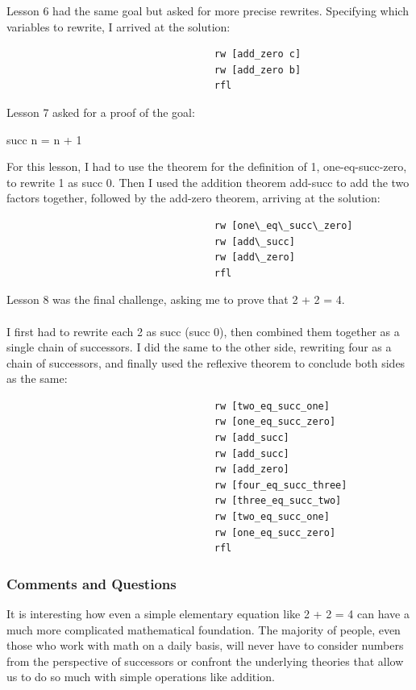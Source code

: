 \documentclass{article}
\theoremstyle{theorem}
\theoremstyle{definition}
\theoremstyle{remark}
\begin{document}
Lesson 6 had the same goal but asked for more precise rewrites. Specifying which variables to rewrite, I arrived at the solution:
\begin{verbatim}
                                    rw [add_zero c]
                                    rw [add_zero b]
                                    rfl
\end{verbatim}
Lesson 7 asked for a proof of the goal:
\begin{center}
      succ n = n + 1
\end{center}
For this lesson, I had to use the theorem for the definition of 1, one-eq-succ-zero, to rewrite 1 as succ 0. Then I used the addition theorem add-succ to add the two factors together, followed by the add-zero theorem, arriving at the solution:
\begin{verbatim}
                                    rw [one\_eq\_succ\_zero] 
                                    rw [add\_succ] 
                                    rw [add\_zero] 
                                    rfl
\end{verbatim}
Lesson 8 was the final challenge, asking me to prove that 2 + 2 = 4. \\\\
I first had to rewrite each 2 as succ (succ 0), then combined them together as a single chain of successors. I did the same to the other side, rewriting four as a chain of successors, and finally used the reflexive theorem to conclude both sides as the same: 
\begin{verbatim}
                                    rw [two_eq_succ_one] 
                                    rw [one_eq_succ_zero]
                                    rw [add_succ]
                                    rw [add_succ] 
                                    rw [add_zero]
                                    rw [four_eq_succ_three]
                                    rw [three_eq_succ_two] 
                                    rw [two_eq_succ_one] 
                                    rw [one_eq_succ_zero] 
                                    rfl
\end{verbatim}

\subsubsection{Comments and Questions}

It is interesting how even a simple elementary equation like 2 + 2 = 4 can have a much more complicated mathematical foundation. 
The majority of people, even those who work with math on a daily basis, will never have to consider numbers from the perspective of successors or confront the 
underlying theories that allow us to do so much with simple operations like addition.
\end{document}
